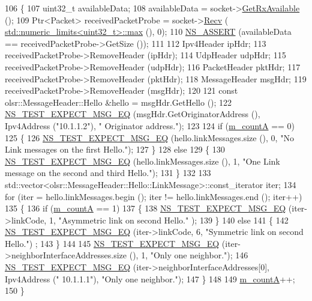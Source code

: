 \begin{DoxyCode}
106 \{
107   uint32\_t availableData;
108   availableData = socket->\hyperlink{classns3_1_1Socket_ad35d8931e53ae0754ee864acb1cecd0e}{GetRxAvailable} ();
109   Ptr<Packet> receivedPacketProbe = socket->\hyperlink{classns3_1_1Socket_a8949b1f844aae563446f2f4c5be8827a}{Recv} (
      \hyperlink{80211b_8c_affe776513b24d84b39af8ab0930fef7f}{std::numeric\_limits<uint32\_t>::max} (), 0);
110   \hyperlink{assert_8h_a6dccdb0de9b252f60088ce281c49d052}{NS\_ASSERT} (availableData == receivedPacketProbe->GetSize ());
111 
112   Ipv4Header ipHdr;
113   receivedPacketProbe->RemoveHeader (ipHdr);
114   UdpHeader udpHdr;
115   receivedPacketProbe->RemoveHeader (udpHdr);
116   PacketHeader pktHdr;
117   receivedPacketProbe->RemoveHeader (pktHdr);
118   MessageHeader msgHdr;
119   receivedPacketProbe->RemoveHeader (msgHdr);
120 
121   \textcolor{keyword}{const} olsr::MessageHeader::Hello &hello = msgHdr.GetHello ();
122   \hyperlink{group__testing_ga7304ba46a28d8cf08dfdfd6499cf7068}{NS\_TEST\_EXPECT\_MSG\_EQ} (msgHdr.GetOriginatorAddress (), Ipv4Address (\textcolor{stringliteral}{"10.1.1.2"}), \textcolor{stringliteral}{"
      Originator address."});
123 
124   \textcolor{keywordflow}{if} (\hyperlink{classns3_1_1olsr_1_1HelloRegressionTest_a89b07fe86d41662bf3ef877f244d333c}{m\_countA} == 0)
125     \{
126       \hyperlink{group__testing_ga7304ba46a28d8cf08dfdfd6499cf7068}{NS\_TEST\_EXPECT\_MSG\_EQ} (hello.linkMessages.size (), 0, \textcolor{stringliteral}{"No Link messages on the
       first Hello."});
127     \}
128   \textcolor{keywordflow}{else}
129     \{
130       \hyperlink{group__testing_ga7304ba46a28d8cf08dfdfd6499cf7068}{NS\_TEST\_EXPECT\_MSG\_EQ} (hello.linkMessages.size (), 1, \textcolor{stringliteral}{"One Link message on the
       second and third Hello."});
131     \}
132 
133   std::vector<olsr::MessageHeader::Hello::LinkMessage>::const\_iterator iter;
134   \textcolor{keywordflow}{for} (iter = hello.linkMessages.begin (); iter != hello.linkMessages.end (); iter++)
135     \{
136       \textcolor{keywordflow}{if} (\hyperlink{classns3_1_1olsr_1_1HelloRegressionTest_a89b07fe86d41662bf3ef877f244d333c}{m\_countA} == 1)
137         \{
138           \hyperlink{group__testing_ga7304ba46a28d8cf08dfdfd6499cf7068}{NS\_TEST\_EXPECT\_MSG\_EQ} (iter->linkCode, 1, \textcolor{stringliteral}{"Asymmetric link on second Hello."}
      );
139         \}
140       \textcolor{keywordflow}{else}
141         \{
142           \hyperlink{group__testing_ga7304ba46a28d8cf08dfdfd6499cf7068}{NS\_TEST\_EXPECT\_MSG\_EQ} (iter->linkCode, 6, \textcolor{stringliteral}{"Symmetric link on second Hello."})
      ;
143         \}
144 
145       \hyperlink{group__testing_ga7304ba46a28d8cf08dfdfd6499cf7068}{NS\_TEST\_EXPECT\_MSG\_EQ} (iter->neighborInterfaceAddresses.size (), 1, \textcolor{stringliteral}{"Only one
       neighbor."});
146       \hyperlink{group__testing_ga7304ba46a28d8cf08dfdfd6499cf7068}{NS\_TEST\_EXPECT\_MSG\_EQ} (iter->neighborInterfaceAddresses[0], Ipv4Address (\textcolor{stringliteral}{"
      10.1.1.1"}), \textcolor{stringliteral}{"Only one neighbor."});
147     \}
148 
149   \hyperlink{classns3_1_1olsr_1_1HelloRegressionTest_a89b07fe86d41662bf3ef877f244d333c}{m\_countA}++;
150 \}
\end{DoxyCode}


